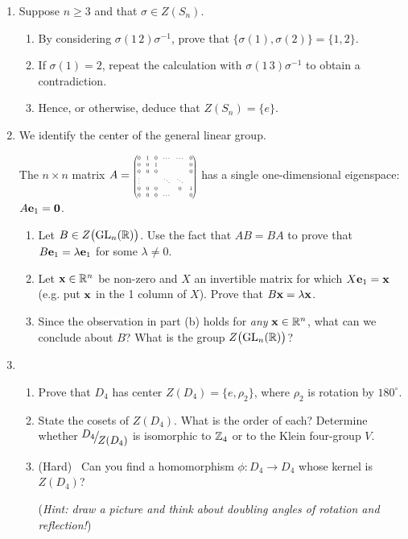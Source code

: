 \begin{exercises}{}{}
\begin{enumerate}
	
	\item Suppose $n\ge 3$ and that $\sigma\in Z(S_n)$.
	\begin{enumerate}
	  \item By considering $\sigma(1\,2)\sigma^{-1}$, prove that $\{\sigma(1),\sigma(2)\}=\{1,2\}$.
	  \item If $\sigma(1)=2$, repeat the calculation with $\sigma(1\,3)\sigma^{-1}$ to obtain a contradiction.
	  \item Hence, or otherwise, deduce that $Z(S_n)=\{e\}$.
	\end{enumerate}
	
	
	\item\label{exs:zglnr} We identify the center of the general linear group.\par
	The $n\times n$ matrix $A=\scalebox{0.5}{$\begin{pmatrix}
	  0&1&0&\cdots&\cdots&0\\
	  0&0&1&&&0\\
	  0&0&0&&&0\\
	  \vdots&&&\ddots&\ddots&\\
	  0&0&0&&0&1\\
	  0&0&0&\cdots&&0
	  \end{pmatrix}$}$ has a single one-dimensional eigenspace: $A{\mathbf{e}}_1=\mathbf{0}$.
	  \begin{enumerate}
	  	\item Let $B\in Z\bigl(\mathrm{GL}_n(\mathbb{R})\bigr)$. Use the fact that $AB=BA$ to prove that $B{\mathbf{e}}_1=\lambda{\mathbf{e}}_1$ for some $\lambda\neq 0$.
	  	\item Let ${\mathbf{x}}\in\mathbb{R}^n$ be non-zero and $X$ an invertible matrix for which $X{\mathbf{e}}_1={\mathbf{x}}$ (e.g. put ${\mathbf{x}}$ in the 1\st{} column of $X$). Prove that $B{\mathbf{x}}=\lambda{\mathbf{x}}$.
	  	\item Since the observation in part (b) holds for \emph{any} ${\mathbf{x}}\in\mathbb{R}^n$, what can we conclude about $B$? What is the group $Z\bigl(\mathrm{GL}_n(\mathbb{R})\bigr)$?
	\end{enumerate}
	
	
	\item\begin{enumerate}
	  \item Prove that $D_4$ has center $Z(D_4)=\{e,\rho_2\}$, where $\rho_2$ is rotation by $180^\circ$.
	  \item State the cosets of $Z(D_4)$. What is the order of each? Determine whether $\quotient{D_4}{Z(D_4)}$ is isomorphic to $\mathbb{Z}_4$ or to the Klein four-group $V$.
	  \item (Hard) \ Can you find a homomorphism $\phi:D_4\to D_4$ whose kernel is $Z(D_4)$?\par
	  (\emph{Hint: draw a picture and think about doubling angles of rotation and reflection!})
	\end{enumerate}



\end{enumerate}
\end{exercises}
